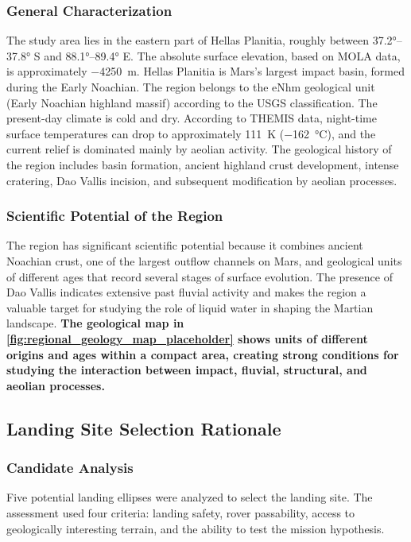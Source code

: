 \subsubsection{General Characterization}
\label{sec:general_characterization}
The study area lies in the eastern part of Hellas Planitia, roughly between \ang{37.2}--\ang{37.8} S and \ang{88.1}--\ang{89.4} E. The absolute surface elevation, based on MOLA data, is approximately \qty{-4250}{\meter}. Hellas Planitia is Mars's largest impact basin, formed during the Early Noachian. The region belongs to the eNhm geological unit (Early Noachian highland massif) according to the USGS classification.
The present-day climate is cold and dry. According to THEMIS data, night-time surface temperatures can drop to approximately \qty{111}{\kelvin} (\qty{-162}{\celsius}), and the current relief is dominated mainly by aeolian activity.
The geological history of the region includes basin formation, ancient highland crust development, intense cratering, Dao Vallis incision, and subsequent modification by aeolian processes.

\subsubsection{Scientific Potential of the Region}
\label{sec:scientific_potential}
The region has significant scientific potential because it combines ancient Noachian crust, one of the largest outflow channels on Mars, and geological units of different ages that record several stages of surface evolution.
The presence of Dao Vallis indicates extensive past fluvial activity and makes the region a valuable target for studying the role of liquid water in shaping the Martian landscape.
\textbf{The geological map in \autoref{fig:regional_geology_map_placeholder} shows units of different origins and ages within a compact area, creating strong conditions for studying the interaction between impact, fluvial, structural, and aeolian processes.}

\subsection{Landing Site Selection Rationale}
\label{sec:landing_site_selection}

\subsubsection{Candidate Analysis}
\label{sec:candidate_analysis}
Five potential landing ellipses were analyzed to select the landing site. The assessment used four criteria: landing safety, rover passability, access to geologically interesting terrain, and the ability to test the mission hypothesis.

